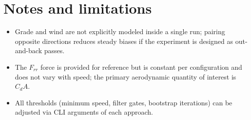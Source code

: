 \documentclass[11pt,a4paper]{article}
\begin{document}
\section{Notes and limitations}
\begin{itemize}
  \item Grade and wind are not explicitly modeled inside a single run; pairing
        opposite directions reduces steady biases if the experiment is designed
        as out-and-back passes.
  \item The $F_{rr}$ force is provided for reference but is constant per
        configuration and does not vary with speed; the primary aerodynamic
        quantity of interest is $C_dA$.
  \item All thresholds (minimum speed, filter gates, bootstrap iterations) can
        be adjusted via CLI arguments of each approach.
\end{itemize}
\end{document}
